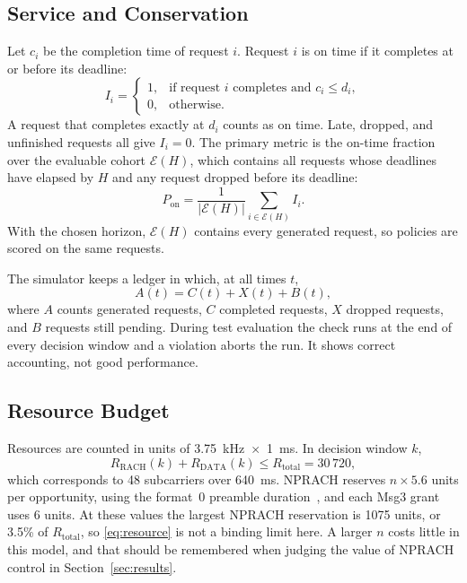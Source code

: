 \documentclass[conference]{IEEEtran}
\begin{document}
\subsection{Service and Conservation}
Let $c_i$ be the completion time of request $i$. Request $i$ is on time if it
completes at or before its deadline:
\begin{equation}
I_i =
\begin{cases}
1, & \text{if request $i$ completes and } c_i \le d_i,\\
0, & \text{otherwise.}
\end{cases}
\label{eq:ontime}
\end{equation}
A request that completes exactly at $d_i$ counts as on time. Late, dropped, and
unfinished requests all give $I_i = 0$. The primary metric is the on-time fraction
over the evaluable cohort $\mathcal{E}(H)$, which contains all requests whose
deadlines have elapsed by $H$ and any request dropped before its deadline:
\begin{equation}
P_{\mathrm{on}} = \frac{1}{|\mathcal{E}(H)|}
\sum_{i \in \mathcal{E}(H)} I_i.
\label{eq:pon}
\end{equation}
With the chosen horizon, $\mathcal{E}(H)$ contains every generated request, so
policies are scored on the same requests.

The simulator keeps a ledger in which, at all times $t$,
\begin{equation}
A(t) = C(t) + X(t) + B(t),
\label{eq:conservation}
\end{equation}
where $A$ counts generated requests, $C$ completed requests, $X$ dropped requests,
and $B$ requests still pending. During test evaluation the check runs at the end of
every decision window and a violation aborts the run. It shows correct accounting,
not good performance.

\subsection{Resource Budget}
Resources are counted in units of 3.75~kHz~$\times$~1~ms. In decision window $k$,
\begin{equation}
R_{\mathrm{RACH}}(k) + R_{\mathrm{DATA}}(k) \le R_{\mathrm{total}} = 30\,720,
\label{eq:resource}
\end{equation}
which corresponds to 48 subcarriers over 640~ms. NPRACH reserves $n \times 5.6$ units
per opportunity, using the format~0 preamble duration~\cite{ts36211}, and each Msg3
grant uses 6 units. At these values the largest NPRACH reservation is 1075 units, or
3.5\% of $R_{\mathrm{total}}$, so \eqref{eq:resource} is not a binding limit here. A
larger $n$ costs little in this model, and that should be remembered when judging the
value of NPRACH control in Section~\ref{sec:results}.
\end{document}
